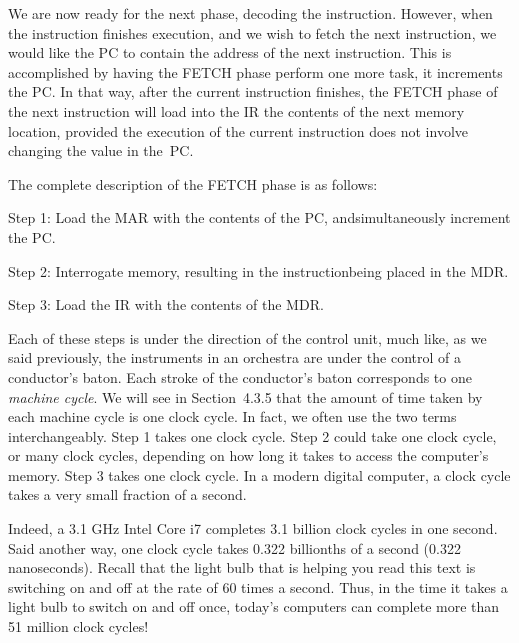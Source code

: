 \documentclass{patt}
\begin{document}
\vspace{3pt}

\noindent
We are now ready for the next phase, decoding the instruction.  However, when 
the instruction finishes execution, and we wish to fetch the next instruction, 
we would like the PC to contain the address of the next instruction.  
This is accomplished by having the FETCH phase perform one more task, it 
increments the PC.  In that way, after the current instruction finishes,
the FETCH phase of the next instruction will load into the IR the contents of 
the next memory location, provided the execution of the current instruction 
does not involve changing the value in the~PC.

The complete description of the FETCH phase is as follows:

\smallskip

\begin{altdesc}
\item[Step 1:] Load the MAR with the contents of the PC,
        and\break simultaneously increment the PC.

\item[Step 2:] Interrogate memory, resulting in
        the instruction\break being placed in the MDR.

\item[Step 3:] Load the IR with the contents of the MDR.

\end{altdesc}

\smallskip

\noindent
{}
Each of these steps is under the direction of the control unit, much like,
as we said previously, the instruments in an orchestra are under the control of
a conductor's baton.  Each stroke of the conductor's baton corresponds to
one {\em machine cycle}.  We will see in Section~4.3.5 that the amount of time
taken by each machine cycle is one clock cycle.  In fact, we often use the
two terms interchangeably.
Step 1 takes one clock cycle.  Step 2 could take
one clock cycle, or many clock cycles, depending on how long it takes to
access the computer's memory.  Step 3 takes one clock cycle.  In a modern
digital computer, a clock cycle takes a very small fraction of a second.

Indeed, a 3.1 GHz Intel Core i7 completes 3.1 billion clock cycles 
in one second.  Said another way, one clock cycle 
takes 0.322 billionths of a second (0.322
nanoseconds).  Recall that the light bulb that is helping you read this text
is switching on and off at the rate of 60 times a second.  Thus, in the time
it takes a light bulb to switch on and off once, today's computers can
complete more than 51 million clock cycles!
\end{document}
